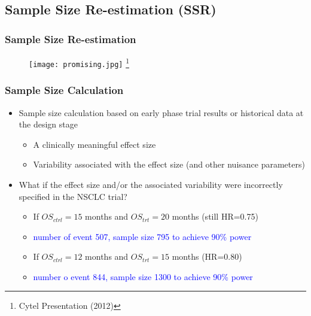 \documentclass{beamer}
\begin{document}
\subsection{Sample Size Re-estimation (SSR)}
\begin{frame}
	\frametitle{Sample Size Re-estimation}
	\begin{figure}
		\begin{center}
			\texttt{[image: promising.jpg]}
			\footnote{Cytel Presentation (2012)}
		\end{center}
	\end{figure}	
\end{frame}
\begin{frame}
	\frametitle{Sample Size Calculation}
\begin{itemize}
	\item Sample size calculation based on early phase trial results or historical data at the design stage \begin{itemize}
	  \item A clinically meaningful effect size
	  \item Variability associated with the effect size (and other nuisance parameters)
	\end{itemize}
	\item What if the effect size and/or the associated variability were incorrectly specified in the NSCLC trial? \begin{itemize}
	\item If $OS_{ctrl}=15$ months and $OS_{trt}=20$ months (still HR=0.75)
	\item \textcolor{blue}{number of event 507, sample size 795 to achieve 90\% power}
	\item If $OS_{ctrl}=12$ months and $OS_{trt}=15$ months (HR=0.80)
	\item \textcolor{blue}{number o event 844, sample size 1300 to achieve 90\% power}
   \end{itemize}
\end{itemize}
\end{frame}
\end{document}

